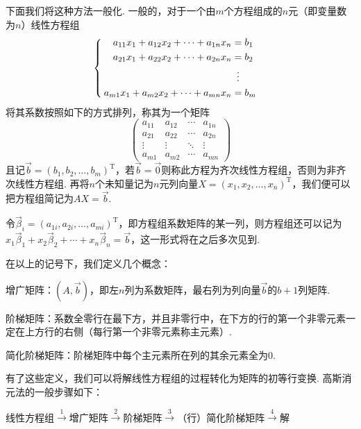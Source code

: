 下面我们将这种方法一般化.
一般的，对于一个由$m$个方程组成的$n$元（即变量数为$n$）线性方程组
\[ \begin{cases} \begin{aligned}
            a_{11}x_1+a_{12}x_2+\cdots+a_{1n}x_n & = b_1           \\
            a_{21}x_1+a_{22}x_2+\cdots+a_{2n}x_n & = b_2           \\
                                                 & \vdotswithin{=} \\
            a_{m1}x_1+a_{m2}x_2+\cdots+a_{mn}x_n & = b_m
        \end{aligned} \end{cases} \]
将其系数按照如下的方式排列，称其为一个矩阵
\[\begin{pmatrix}
        a_{11} & a_{12} & \cdots & a_{1n} \\
        a_{21} & a_{22} & \cdots & a_{2n} \\
        \vdots & \vdots & \ddots & \vdots \\
        a_{m1} & a_{m2} & \cdots & a_{mn}
    \end{pmatrix}\]
且记$\vec{b}=(b_1,b_2,\ldots,b_m)^\mathrm{T}$，若$\vec{b}=\vec{0}$则称此方程为齐次线性方程组，否则为非齐次线性方程组. 再将$n$个未知量记为$n$元列向量$X=(x_1,x_2,\ldots,x_n)^\mathrm{T}$，我们便可以把方程组简记为$AX=\vec{b}$.

令$\vec{\beta}_i=(a_{1i},a_{2i},\ldots,a_{mi})^\mathrm{T}$，即方程组系数矩阵的某一列，则方程组还可以记为$x_1\vec{\beta}_1+x_2\vec{\beta}_2+\cdots+x_n\vec{\beta}_n=\vec{b}$\label{线性方程的向量表示}，这一形式将在之后多次见到.

在以上的记号下，我们定义几个概念：

增广矩阵：$(A,\vec{b})$，即左$n$列为系数矩阵，最右列为列向量$\vec{b}$的$b+1$列矩阵.

阶梯矩阵：系数全零行在最下方，并且非零行中，在下方的行的第一个非零元素一定在上方行的右侧（每行第一个非零元素称主元素）.

简化阶梯矩阵：阶梯矩阵中每个主元素所在列的其余元素全为$0$.

有了这些定义，我们可以将解线性方程组的过程转化为矩阵的初等行变换. 高斯消元法的一般步骤如下：
\begin{center}
    线性方程组$\overset{1}{\longrightarrow}$增广矩阵$\overset{2}{\longrightarrow}$阶梯矩阵$\overset{3}{\longrightarrow}$（行）简化阶梯矩阵$\overset{4}{\longrightarrow}$解
\end{center}

